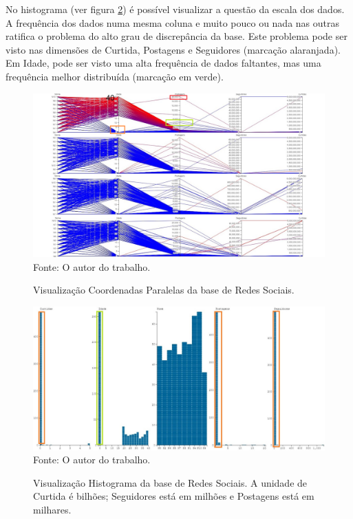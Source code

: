 \documentclass[
	12pt,				%
	openright,			%
	oneside,			%
	a4paper,			%
	english,			%
	brazil				%
	]{abntex2}
\begin{document}
	No histograma (ver figura \ref{fig:HistogramaRS}) é possível visualizar a questão da escala dos dados.
	A frequência dos dados numa mesma coluna e muito pouco ou nada nas outras ratifica o problema do alto grau de discrepância da base.
	Este problema pode ser visto nas dimensões de Curtida, Postagens e Seguidores (marcação alaranjada).
	Em Idade, pode ser visto uma alta frequência de dados faltantes, mas uma frequência melhor distribuída (marcação em verde).
	\par

	\begin{figure}[h!]
		\centering
		\caption{Visualização Coordenadas Paralelas da base de Redes Sociais.}
		\includegraphics[width=\linewidth]{./figures/Resultados/PCRS.png}
		\label{fig:PCRS}
		\footnotesize Fonte: O autor do trabalho.
	\end{figure}

	\begin{figure}[h!]
		\centering
		\caption{Visualização Histograma da base de Redes Sociais. A unidade de Curtida é bilhões; Seguidores está em milhões e Postagens está em milhares.}
		\includegraphics[width=\linewidth]{./figures/Resultados/HistogramaRS.jpg}
		\label{fig:HistogramaRS}
		\footnotesize Fonte: O autor do trabalho.
	\end{figure}
\end{document}
